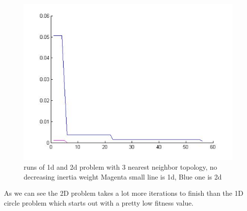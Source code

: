 \documentclass[12pt, a4paper]{article}
\begin{document}
\begin{figure}[H]

\includegraphics[width=\linewidth]{3nn_no_inertia}
\caption{runs of 1d and 2d problem with 3 nearest neighbor topology, no decreasing inertia weight
Magenta small line is 1d, Blue one is 2d}
\end{figure}
As we can see the 2D problem takes a lot more iterations to finish than the 1D circle problem which starts out with a pretty low fitness value.
\end{document}
